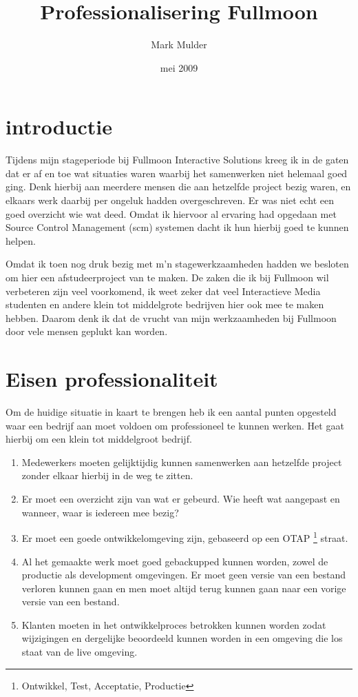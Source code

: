 \documentclass[12pt,a4paper]{article}
\title{Professionalisering Fullmoon}
\author{Mark Mulder}
\date{mei 2009}
\begin{document}
  
  \maketitle
  \pagebreak
  
  \tableofcontents  
  \pagebreak
  
  \section{introductie}

  Tijdens mijn stageperiode bij Fullmoon Interactive Solutions kreeg ik in de gaten dat er af en toe wat situaties waren waarbij het samenwerken niet helemaal goed ging. Denk hierbij aan meerdere mensen die aan hetzelfde project bezig waren, en elkaars werk daarbij per ongeluk hadden overgeschreven. Er was niet echt een goed overzicht wie wat deed. Omdat ik hiervoor al ervaring had opgedaan met Source Control Management {\sc (scm)} systemen dacht ik hun hierbij goed te kunnen helpen.
    
    Omdat ik toen nog druk bezig met m'n stagewerkzaamheden hadden we besloten om hier een afstudeerproject van te maken. De zaken die ik bij Fullmoon wil verbeteren zijn veel voorkomend, ik weet zeker dat veel Interactieve Media studenten en andere klein tot middelgrote bedrijven hier ook mee te maken hebben. Daarom denk ik dat de vrucht van mijn werkzaamheden bij Fullmoon door vele mensen geplukt kan worden.
    
  \section{Eisen professionaliteit}

  Om de huidige situatie in kaart te brengen heb ik een aantal punten opgesteld waar een bedrijf aan moet voldoen om professioneel te kunnen werken. Het gaat hierbij om een klein tot middelgroot bedrijf.

  \begin{enumerate}
    \item Medewerkers moeten gelijktijdig kunnen samenwerken aan hetzelfde project zonder elkaar hierbij in de weg te zitten.
    \item Er moet een overzicht zijn van wat er gebeurd. Wie heeft wat aangepast en wanneer, waar is iedereen mee bezig?
    \item Er moet een goede ontwikkelomgeving zijn, gebaseerd op een OTAP \footnote{Ontwikkel, Test, Acceptatie, Productie} straat.
    \item Al het gemaakte werk moet goed gebackupped kunnen worden, zowel de productie als development omgevingen. Er moet geen versie van een bestand verloren kunnen gaan en men moet altijd terug kunnen gaan naar een vorige versie van een bestand.
    \item Klanten moeten in het ontwikkelproces betrokken kunnen worden zodat wijzigingen en dergelijke beoordeeld kunnen worden in een omgeving die los staat van de live omgeving.
  \end{enumerate}
\end{document}
